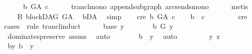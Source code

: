 \begin{isabellebody}
\ \ \isamarkupfalse%
\ \isamarkupfalse%
\ {\isachardoublequoteopen}b\ {\isasymrightarrow}\isactrlsup {\isacharplus}{\kern0pt}\isactrlbsub G{\isacharunderscore}{\kern0pt}A\isactrlesub \ c{\isachardoublequoteclose}\isanewline
\ \ \ \ \isamarkupfalse%
\ trancl{\isacharunderscore}{\kern0pt}mono\ append{\isacharunderscore}{\kern0pt}subgraph\ arcs{\isacharunderscore}{\kern0pt}ends{\isacharunderscore}{\kern0pt}mono\isanewline
\ \ \ \ \isamarkupfalse%
\ metis\isanewline
{}\isamarkupfalse%
\ \isanewline
\ \ \isamarkupfalse%
\ B{}{\isacharcolon}{\kern0pt}\ blockDAG\ {\isachardoublequoteopen}G{\isacharunderscore}{\kern0pt}A{\isachardoublequoteclose}\ \isamarkupfalse%
\ bD{\isacharunderscore}{\kern0pt}A\ \isamarkupfalse%
\ simp\isanewline
\ \ \isamarkupfalse%
\ c{\isacharunderscore}{\kern0pt}re{\isacharcolon}{\kern0pt}\ {\isachardoublequoteopen}b\ {\isasymrightarrow}\isactrlsup {\isacharplus}{\kern0pt}\isactrlbsub G{\isacharunderscore}{\kern0pt}A\isactrlesub \ c{\isachardoublequoteclose}\isanewline
\ \ \isamarkupfalse%
\ {\isachardoublequoteopen}b\ {\isasymrightarrow}\isactrlsup {\isacharplus}{\kern0pt}\ c{\isachardoublequoteclose}\ \ \ \isanewline
\ \ \ \ \isamarkupfalse%
\ c{\isacharunderscore}{\kern0pt}re\isanewline
\ \ \isamarkupfalse%
{\isacharparenleft}{\kern0pt}cases\ \ rule{\isacharcolon}{\kern0pt}\ trancl{\isacharunderscore}{\kern0pt}induct{\isacharparenright}{\kern0pt}\isanewline
\ \ \ \ \isamarkupfalse%
\ {\isacharparenleft}{\kern0pt}base\ y{\isacharparenright}{\kern0pt}\isanewline
\ \ \ \ \isamarkupfalse%
\ \isamarkupfalse%
\ {\isachardoublequoteopen}b\ {\isasymrightarrow}\isactrlbsub G\isactrlesub \ y{\isachardoublequoteclose}\ \isamarkupfalse%
\ dominates{\isacharunderscore}{\kern0pt}preserve\ assms{\isacharparenleft}{\kern0pt}{}{\isacharparenright}{\kern0pt}\ \isamarkupfalse%
\ auto\isanewline
\ \ \ \ \isamarkupfalse%
\ \isamarkupfalse%
\ {\isachardoublequoteopen}b\ {\isasymrightarrow}\isactrlsup {\isacharplus}{\kern0pt}\ y{\isachardoublequoteclose}\ \isamarkupfalse%
\ auto\isanewline
\ \ \isamarkupfalse%
\isanewline
\ \ \ \ \isamarkupfalse%
\ y\ z\ \ \ \ \isanewline
\ \ \ \ \isamarkupfalse%
\ b{\isacharunderscore}{\kern0pt}y{\isacharcolon}{\kern0pt}\ {\isachardoublequoteopen}b\ {\isasymrightarrow}\isactrlsup {\isacharplus}{\kern0pt}\ y{\isachardoublequoteclose}\ \isanewline

\end{isabellebody}
